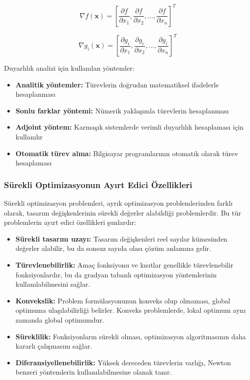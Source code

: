 \begin{equation}
\nabla f(\mathbf{x}) = \left[ \frac{\partial f}{\partial x_1}, \frac{\partial f}{\partial x_2}, \ldots, \frac{\partial f}{\partial x_n} \right]^T
\end{equation}

\begin{equation}
\nabla g_i(\mathbf{x}) = \left[ \frac{\partial g_i}{\partial x_1}, \frac{\partial g_i}{\partial x_2}, \ldots, \frac{\partial g_i}{\partial x_n} \right]^T
\end{equation}

Duyarlılık analizi için kullanılan yöntemler:
\begin{itemize}
    \item \textbf{Analitik yöntemler:} Türevlerin doğrudan matematiksel ifadelerle hesaplanması
    \item \textbf{Sonlu farklar yöntemi:} Nümerik yaklaşımla türevlerin hesaplanması
    \item \textbf{Adjoint yöntem:} Karmaşık sistemlerde verimli duyarlılık hesaplaması için kullanılır
    \item \textbf{Otomatik türev alma:} Bilgisayar programlarının otomatik olarak türev hesaplaması
\end{itemize}

\subsubsection{Sürekli Optimizasyonun Ayırt Edici Özellikleri}
Sürekli optimizasyon problemleri, ayrık optimizasyon problemlerinden farklı olarak, tasarım değişkenlerinin sürekli değerler alabildiği problemlerdir. Bu tür problemlerin ayırt edici özellikleri şunlardır:

\begin{itemize}
    \item \textbf{Sürekli tasarım uzayı:} Tasarım değişkenleri reel sayılar kümesinden değerler alabilir, bu da sonsuz sayıda olası çözüm anlamına gelir.
    
    \item \textbf{Türevlenebilirlik:} Amaç fonksiyonu ve kısıtlar genellikle türevlenebilir fonksiyonlardır, bu da gradyan tabanlı optimizasyon yöntemlerinin kullanılabilmesini sağlar.
    
    \item \textbf{Konvekslik:} Problem formülasyonunun konveks olup olmaması, global optimuma ulaşılabilirliği belirler. Konveks problemlerde, lokal optimum aynı zamanda global optimumdur.
    
    \item \textbf{Süreklilik:} Fonksiyonların sürekli olması, optimizasyon algoritmasının daha kararlı çalışmasını sağlar.
    
    \item \textbf{Diferansiyellenebilirlik:} Yüksek dereceden türevlerin varlığı, Newton benzeri yöntemlerin kullanılabilmesine olanak tanır.
\end{itemize}

